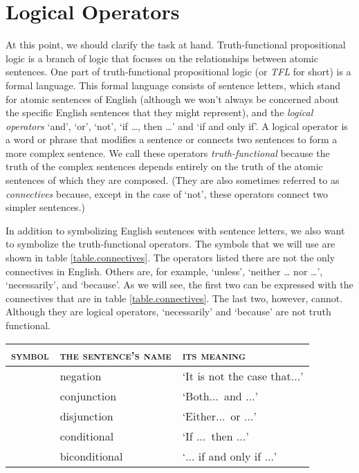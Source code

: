 


\chapter{Logical Operators}
\label{s:TFLConnectives}

At this point, we should clarify the task at hand. Truth-functional propositional logic is a branch of logic that focuses on the relationships between atomic sentences. One part of truth-functional propositional logic (or \textit{TFL} for short) is a formal language. This formal language consists of sentence letters, which stand for atomic sentences of English (although we won't always be concerned about the specific English sentences that they might represent), and the \textit{logical operators} `and', `or', `not', `if \ldots, then \ldots' and `if and only if'. A logical operator is a word or phrase that modifies a sentence or connects two sentences to form a more complex sentence. We call these operators \textit{truth-functional} because the truth of the complex sentences depends entirely on the truth of the atomic sentences of which they are composed. (They are also sometimes referred to as \textit{connectives} because, except in the case of `not', these operators connect two simpler sentences.)  

In addition to symbolizing English sentences with sentence letters, we also want to symbolize the truth-functional operators. The symbols that we will use are shown in table \ref{table.connectives}. The operators listed there are not the only connectives in English. Others are, for example, `unless', `neither \dots{} nor \dots', `necessarily', and `because'. As we will see, the first two can be expressed with the connectives that are in table \ref{table.connectives}. The last two, however, cannot. Although they are logical operators, `necessarily' and `because' are not truth functional.
	
\begin{table*}\centering\sffamily\footnotesize
{}
\begin{tabular}{@{}l l l@{}}\toprule
\textsc{symbol} & \textsc{the sentence's name} & \textsc{its meaning}\\\midrule
	\enot&negation&`It is not the case that$\ldots$'\\
	\eand&conjunction&`Both$\ldots$\ and $\ldots$'\\
	\eor&disjunction&`Either$\ldots$\ or $\ldots$'\\
	\eif&conditional&`If $\ldots$\ then $\ldots$'\\
	\eiff&biconditional&`$\ldots$ if and only if $\ldots$'\\
\bottomrule
\end{tabular}
\caption{}\label{table.connectives}
\end{table*}
	
